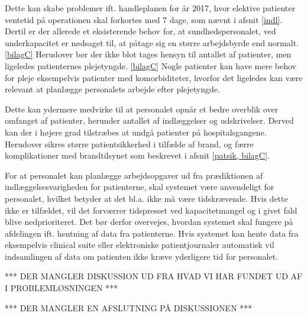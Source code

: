Dette kan skabe problemer ift. handleplanen for år 2017, hvor elektive patienter ventetid på operationen skal forkortes med 7 dage, som nævnt i afsnit \ref{indl}. Dertil er der allerede et eksisterende behov for, at sundhedspersonalet, ved underkapacitet er nødsaget til, at påtage sig en større arbejdsbyrde end normalt. \ref{bilagC} Herudover bør der ikke blot tages hensyn til antallet af patienter, men ligeledes patienternes plejetyngde. \ref{bilagC} Nogle patienter kan have mere behov for pleje eksempelvis patienter med komorbiditeter, hvorfor det ligeledes kan være relevant at planlægge personalets arbejde efter plejetyngde. 


Dette kan ydermere medvirke til at personalet opnår et bedre overblik over omfanget af patienter, herunder antallet af indlæggelser og udskrivelser. Derved kan der i højere grad tilstræbes at  undgå patienter på hospitalsgangene. Herudover sikres større patientsikkerhed i tilfælde af brand, og færre komplikationer med brandtilsynet som beskrevet i afsnit \ref{patsik, bilagC}. 


\noindent
For at personalet kan planlægge arbejdsopgaver ud fra prædiktionen af indlæggelsesvarigheden for patienterne, skal systemet være anvendeligt for personalet, hvilket betyder at det bl.a. ikke må være tidskrævende. Hvis dette ikke er tilfældet, vil det forværrer tidspresset ved kapacitetmangel og i givet fald blive nedprioriteret. Det bør derfor overvejes, hvordan systemet skal fungere på afdelingen ift. hentning af data fra patienterne. Hvis systemet kan hente data fra eksempelvis clinical suite eller elektroniske patientjournaler automatisk vil indsamlingen af data om patienten ikke kræve yderligere tid for personalet. 


\noindent
*** DER MANGLER DISKUSSION UD FRA HVAD VI HAR FUNDET UD AF I PROBLEMLØSNINGEN ***

\noindent
*** DER MANGLER EN AFSLUTNING PÅ DISKUSSIONEN ***